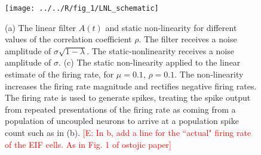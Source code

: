 \documentclass[%
 reprint,
 twocolumn,
 amsmath,amssymb,
 aps,
floatfix,
]{revtex4}
\newcommand{\Ecomment}[1]{\textcolor{red}{[E: #1]}}
\begin{document}
%
%
%
%


\begin{figure}[t!]
\texttt{[image: ../../R/fig\_1/LNL\_schematic]}
\caption{\label{fig:schematic2}  (a) The linear filter $A(t)$ and static non-linearity for different values of the correlation coefficient $\rho$. The filter receives a noise amplitude of $\sigma\sqrt{1-\lambda}$. The static-nonlinearity receives a noise amplitude of $\sigma$. (c) The static non-linearity applied to the linear estimate of the firing rate, for $\mu = 0.1$, $\rho = 0.1$. The non-linearity increases the firing rate magnitude and rectifies negative firing rates. The firing rate is used to generate spikes, treating the spike output from repeated presentations of the firing rate as coming from a population of uncoupled neurons to arrive at a population spike count such as in (b).  \Ecomment{In b, add a line for the ``actual" firing rate of the EIF cells. As in Fig. 1 of ostojic paper}}
\end{figure}
\end{document}
